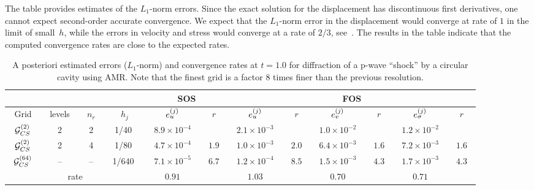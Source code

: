 The table provides estimates of the $L_1$-norm errors. Since the exact solution for the displacement 
has discontinuous first derivatives, one cannot expect second-order accurate convergence. 
We expect that the $L_1$-norm error in the displacement would converge at rate of $1$ in the limit of small~$h$, while the
errors in velocity and stress would converge at a rate of $2/3$, see~\cite{BanksAslamRider2008}. 
The results in the table indicate that the computed convergence rates are close to the expected rates.
%
{
\renewcommand{\arraystretch}{\tablearraystretch}%
\newcommand{\rateLabelb}{\multicolumn{4}{|c|}{rate}}
\begin{table}[hbt]\tableFontSize
\begin{center}
\begin{tabular}{|c|c|c|c|c|c|c|c|c|c|c|c|} \hline
\multicolumn{4}{|c|}{ } & \multicolumn{2}{|c|}{SOS} & \multicolumn{6}{|c|}{FOS} \\ \hline 
Grid &~levels~&~$n_r$~ &~~$h_j$~~& $e^{(j)}_u$ & $r$ & $e^{(j)}_u$ & $r$ & $e^{(j)}_v$ & $r$  & $e^{(j)}_\sigma$  & $r$ \\ \hline 
~${\mathcal G}_{CS}^{(2)}$~ & 2  & 2  &~1/40  ~& ~$8.9\times10^{ -4}$~&         & ~$2.1\times10^{ -3}$~ &        & ~$1.0\times10^{ -2}$~ &        & ~$1.2\times10^{ -2}$~ &        \\ \hline 
~${\mathcal G}_{CS}^{(2)}$~ & 2  & 4  &~1/80  ~& ~$4.7\times10^{ -4}$~&~$ 1.9$~ & ~$1.0\times10^{ -3}$~ &~$ 2.0$~& ~$6.4\times10^{ -3}$~ &~$ 1.6$~& ~$7.2\times10^{ -3}$~ &~$ 1.6$~\\ \hline 
~${\mathcal G}_{CS}^{(64)}$~& -- & -- &~1/640 ~& ~$7.1\times10^{ -5}$~&~$ 6.7$~ & ~$1.2\times10^{ -4}$~ &~$ 8.5$~& ~$1.5\times10^{ -3}$~ &~$ 4.3$~& ~$1.7\times10^{ -3}$~ &~$ 4.3$~ \\ \hline 
\rateLabelb                      &  $ 0.91$             &        &  $ 1.03$   &        &  $ 0.70$   &        &  $ 0.71$   &    \\ \hline                                        
\end{tabular}
\caption{A posteriori estimated errors ($L_1$-norm) and convergence rates at $t=1.0$ for diffraction of a p-wave ``shock''
         by a circular cavity using AMR. Note that the finest grid is a factor $8$ times finer than the previous resolution. }
\label{tab:cylDiffractConvergence}
\end{center}
\end{table}
}


